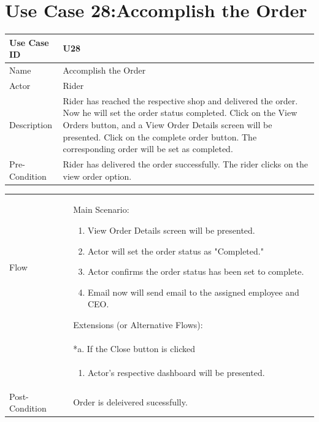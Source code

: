 \documentclass[12pt,a4paper]{report}
\begin{document}
\section{Use Case 28:Accomplish the Order}

\begin{tabular}{ | m{3cm} | m{12cm}| } \hline

Use Case ID &  U28 \\\hline

Name  	    &  Accomplish the Order \\ \hline

Actor     	& Rider \\ \hline

Description  & Rider has reached the respective shop and delivered the order. Now he will set the order status completed. Click on the View Orders button, and a View Order Details screen will be presented. Click on the complete order button. The corresponding order will be set as completed. \\ \hline

Pre-Condition & Rider has delivered the order successfully. The rider clicks on the view order option.  \\ \hline
\end{tabular}
\begin{tabular}{ | m{3cm} | m{12cm}| } \hline
Flow & Main Scenario:

\begin{enumerate}

\item View Order Details screen will be presented.
\item Actor will set the order status as "Completed."
\item Actor confirms the order status has been set to complete.
\item Email now will send email to the assigned employee and CEO.
\end{enumerate}

Extensions (or Alternative Flows):\\
& *a. If the Close button is clicked \\
& \begin{enumerate}
		\item Actor's respective dashboard will be presented.
	\end{enumerate}
\\ \hline
Post-Condition &  Order is deleivered sucessfully.\\ \hline
\end{tabular}
\end{document}
